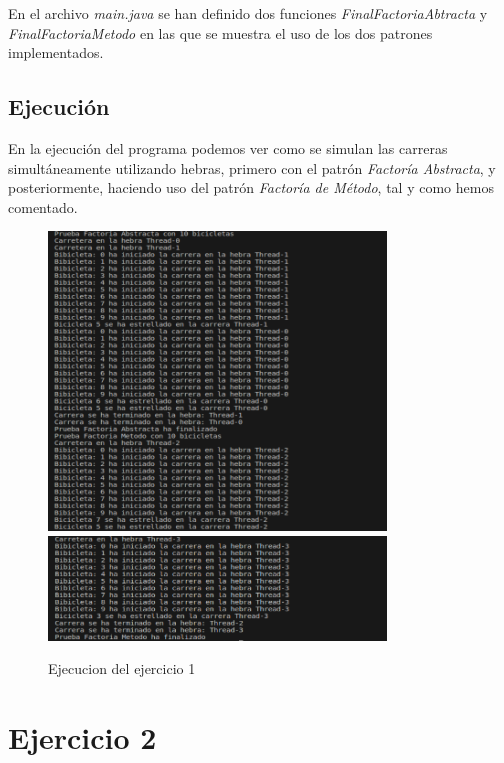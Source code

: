 \documentclass{article}
\begin{document}
En el archivo \textit{main.java} se han definido dos funciones \textit{FinalFactoriaAbtracta} y \textit{FinalFactoriaMetodo}
en las que se muestra el uso de los dos patrones implementados. 


\newpage
\vspace{15pt}
\subsection{Ejecución}

En la ejecución del programa podemos ver como se simulan las carreras simultáneamente utilizando hebras, primero con el patrón \textit{Factoría Abstracta}, y posteriormente, haciendo uso del patrón \textit{Factoría de Método}, tal y como hemos comentado.

\begin{figure}[h]
	\centering
        \vspace{15pt}
	\includegraphics[width=0.8\textwidth]{DS_ejecucion_ej1-1.png}
        \includegraphics[width=0.8\textwidth]{DS_ejecucion_ej1-2.png}
	\caption{Ejecucion del ejercicio 1}
	\label{fig:ej1}
\end{figure}



\newpage
\section{Ejercicio 2}
\end{document}
